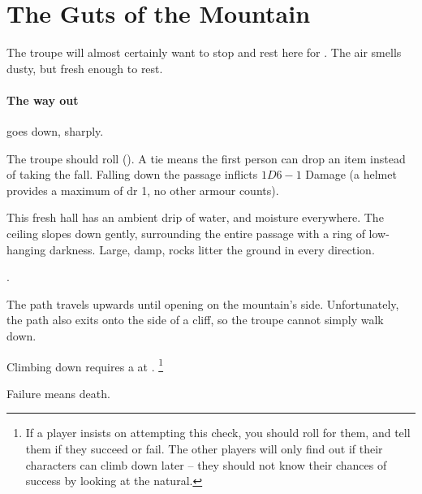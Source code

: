 \section{The Guts of the Mountain}

\begin{multicols}{2}


The troupe will almost certainly want to stop and rest here for .
The air smells dusty, but fresh enough to rest.

\paragraph{The way out}
goes down, sharply.

The troupe should roll  (\tn[10]).
A tie means the first person can drop an item instead of taking the fall.
Falling down the passage inflicts $1D6-1$ Damage (a helmet provides a maximum of \gls{dr} 1, no other armour counts).

\begin{boxtext}
  This fresh hall has an ambient drip of water, and moisture everywhere.
  The ceiling slopes down gently, surrounding the entire passage with a ring of low-hanging darkness.
  Large, damp, rocks litter the ground in every direction.
\end{boxtext}

.



The path travels upwards until opening on the mountain's side.
Unfortunately, the path also exits onto the side of a cliff, so the troupe cannot simply walk down.

Climbing down requires a  at \tn[14].%
\footnote{If a player insists on attempting this check, you should roll for them, and tell them if they succeed or fail.  The other players will only find out if their characters can climb down later -- they should not know their chances of success by looking at the \gls{natural}.}

Failure means death.





\end{multicols}
